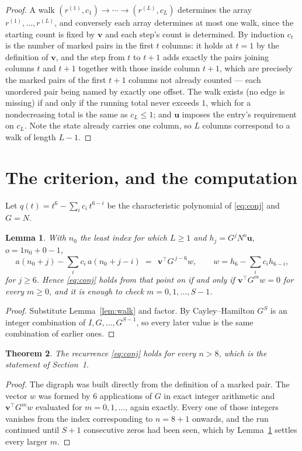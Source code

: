 \documentclass[11pt,a4paper]{article}
\theoremstyle{plain}
\newtheorem{theorem}{Theorem}
\newtheorem{lemma}[theorem]{Lemma}
\theoremstyle{definition}
\begin{document}
\begin{proof}
A walk $(r^{(1)},c_1)\to\cdots\to(r^{(L)},c_L)$ determines the array
$r^{(1)},\dots,r^{(L)}$, and conversely each array determines at most one walk, since the
starting count is fixed by $\mathbf{v}$ and each step's count is determined. By induction
$c_t$ is the number of marked pairs in the first $t$ columns: it holds at $t=1$ by the
definition of $\mathbf{v}$, and the step from $t$ to $t+1$ adds exactly the pairs joining
columns $t$ and $t+1$ together with those inside column $t+1$, which are precisely the marked
pairs of the first $t+1$ columns not already counted --- each unordered pair being named by
exactly one offset. The walk exists (no edge is missing) if and only if the running total
never exceeds $1$, which for a nondecreasing total is the same as $c_L\le1$; and
$\mathbf{u}$ imposes the entry's requirement on $c_L$. Note the state already carries one
column, so $L$ columns correspond to a walk of length $L-1$.
\end{proof}

\section{The criterion, and the computation}

Let $q(t)=t^{6}-\sum_i c_i\,t^{6-i}$ be the characteristic polynomial of
\eqref{eq:conj} and $G=N$.

\begin{lemma}\label{lem:crit}
With $n_0$ the least index for which $L\ge1$ and $h_j=G^{j}N^{o}\mathbf{u}$,
$o=1n_0+0-1$,
\[
a(n_0+j)-\sum_i c_i\,a(n_0+j-i)\;=\;\,\mathbf{v}^{\!\top}G^{\,j-6}w,
\qquad w=h_{6}-\sum_i c_i h_{6-i},
\]
for $j\ge6$. Hence \eqref{eq:conj} holds from that point on if and only if
$\mathbf{v}^{\!\top}G^{m}w=0$ for every $m\ge0$, and it is enough to check
$m=0,1,\dots,S-1$.
\end{lemma}

\begin{proof}
Substitute Lemma~\ref{lem:walk} and factor. By Cayley--Hamilton $G^{S}$ is an integer
combination of $I,G,\dots,G^{S-1}$, so every later value is the same combination of earlier
ones.
\end{proof}

\begin{theorem}
The recurrence \eqref{eq:conj} holds for every $n>8$, which is the statement of
Section~1.
\end{theorem}

\begin{proof}
The digraph was built directly from the definition of a marked pair. The vector $w$ was
formed by $6$ applications of $G$ in exact integer arithmetic and
$\mathbf{v}^{\!\top}G^{m}w$ evaluated for $m=0,1,\dots$, again exactly. Every one of
those integers vanishes from the index corresponding to $n=8+1$ onwards, and the run
continued until $S+1$ consecutive zeros had been seen, which by Lemma~\ref{lem:crit}
settles every larger $m$.
\end{proof}
\end{document}
